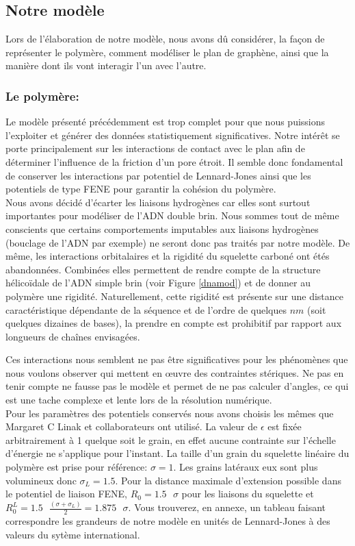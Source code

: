 \documentclass[a4paper,11pt]{article}
\begin{document}
\subsection{Notre modèle}

Lors de l'élaboration de notre modèle, nous avons dû considérer, la façon de représenter le polymère, comment modéliser le plan de graphène, ainsi que la manière dont ils vont interagir l'un avec l'autre.

\subsubsection*{Le polymère:}

Le modèle présenté précédemment est trop complet pour que nous puissions l'exploiter et générer des données statistiquement significatives. Notre intérêt se porte principalement sur les interactions de contact avec le plan afin de déterminer l'influence de la friction d'un pore étroit. Il semble donc fondamental de conserver les interactions par potentiel de Lennard-Jones ainsi que les potentiels de type FENE pour garantir la cohésion du polymère.\\

Nous avons décidé d'écarter les liaisons hydrogènes car elles sont surtout importantes pour modéliser de l'ADN double brin. Nous sommes tout de même conscients que certains comportements imputables aux liaisons hydrogènes (bouclage de l'ADN par exemple) ne seront donc pas traités par notre modèle. De même, les interactions orbitalaires et la rigidité du squelette carboné ont étés abandonnées. Combinées elles permettent de rendre compte de la structure hélicoïdale de l'ADN simple brin (voir Figure \ref{dnamod}) et de donner au polymère une rigidité. Naturellement, cette rigidité est présente sur une distance caractéristique dépendante de la séquence et de l'ordre de quelques $nm$ (soit quelques dizaines de bases), la prendre en compte est prohibitif par rapport aux longueurs de chaînes envisagées.

Ces interactions nous semblent ne pas être significatives pour les phénomènes que nous voulons observer qui mettent en œuvre des contraintes stériques. Ne pas en tenir compte ne fausse pas le modèle et permet de ne pas calculer d'angles, ce qui est une tache complexe et lente lors de la résolution numérique.\\

Pour les paramètres des potentiels conservés nous avons choisis les mêmes que Margaret C Linak et collaborateurs \cite{jchem} ont utilisé. La valeur de $\epsilon$ est fixée arbitrairement à 1 quelque soit le grain, en effet aucune contrainte sur l'échelle d'énergie ne s'applique pour l'instant. La taille d'un grain du squelette linéaire du polymère est prise pour référence: $\sigma=1$. Les grains latéraux eux sont plus volumineux donc $\sigma_{L}=1.5$. Pour la distance maximale d'extension possible dans le potentiel de liaison FENE, $R_0=1.5\text{ } \sigma$ pour les liaisons du squelette et $R_0^{L}=1.5 \text{ }\frac{(\sigma+\sigma_{L})}{2} = 1.875\text{ } \sigma$. Vous trouverez, en annexe, un tableau faisant correspondre les grandeurs de notre modèle en unités de Lennard-Jones à des valeurs du sytème international.
\end{document}
